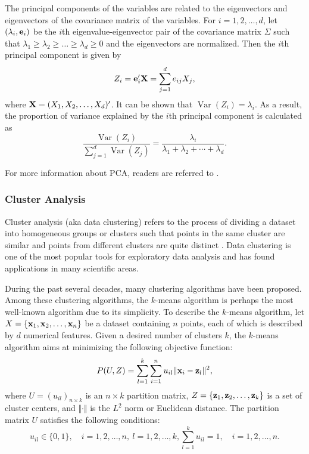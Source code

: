 \documentclass[12pt]{article}
\newcommand{\var}{\operatorname{Var}}
\newcommand{\bfx}[1]{{\bf #1}}
\begin{document}
The principal components of the variables are related to the eigenvectors and eigenvectors of the covariance matrix of the variables. For $i=1,2,\ldots,d$, let $(\lambda_i, \bfx{e}_i)$ be the $i$th eigenvalue-eigenvector pair of the covariance matrix ${\Sigma}$ such that $\lambda_1\ge \lambda_2\ge \ldots\ge \lambda_d\ge 0$ and the eigenvectors are normalized. Then the $i$th principal component is given by
\begin{equation}\label{eq:pca-pci}
Z_{i} = \bfx{e}_i' \bfx{X} =\sum_{j=1}^d e_{ij} X_j,
\end{equation} 
where $\bfx{X}=(X_1,X_2,\ldots,X_d)'$. It can be shown that $\var{(Z_i)} = \lambda_i$. As a result, the proportion of variance explained by the $i$th principal component is calculated as
\begin{equation}\label{eq:pca-proportion}
\dfrac{\var{(Z_i)}}{ \sum_{j=1}^{d} \var{(Z_j)}} = \dfrac{\lambda_i}{\lambda_1+\lambda_2+\cdots+\lambda_d}. 
\end{equation}

For more information about PCA, readers are referred to \citep{mirkin2011}.

\subsubsection{Cluster Analysis}

Cluster analysis (aka data clustering) refers to the process of dividing a dataset into homogeneous groups or clusters such that points in the same cluster are similar and points from different clusters are quite distinct \citep{gan2007,gan2011}. Data clustering is one of the most popular tools for exploratory data analysis and has found applications in many scientific areas. 

During the past several decades, many clustering algorithms have been proposed. Among these clustering algorithms, the $k$-means algorithm is perhaps the most well-known algorithm due to its simplicity. To describe the $k$-means algorithm, let $X=\{\bfx{x}_1,\bfx{x}_2,\ldots,\bfx{x}_n\}$ be a dataset containing $n$ points, each of which is described by $d$ numerical features. Given a desired number of clusters $k$, the $k$-means algorithm aims at minimizing the following objective function:
\begin{equation}\label{eq:kmeanobj}
P(U,Z) = \sum_{l=1}^k\sum_{i=1}^n u_{il} \Vert \bfx{x}_i-\bfx{z}_l\Vert^2,
\end{equation}
where $U=(u_{il})_{n\times k}$ is an $n\times k$ partition matrix, $Z=\{\bfx{z}_1,\bfx{z}_2,\ldots,\bfx{z}_k\}$ is a set of cluster centers, and $\Vert\cdot\Vert$ is the $L^2$ norm or Euclidean distance. The partition matrix $U$ satisfies the following conditions:
\begin{subequations}\label{eq:ucond}
	\begin{equation}\label{eq:uconda}
	u_{il}\in \{0,1\},\quad i=1,2,\ldots,n,\:l=1,2,\ldots,k,
	\end{equation}
	\begin{equation}\label{eq:ucondb}
	\sum_{l=1}^k u_{il}=1,\quad i=1,2,\ldots,n.
	\end{equation}
\end{subequations}
\end{document}
